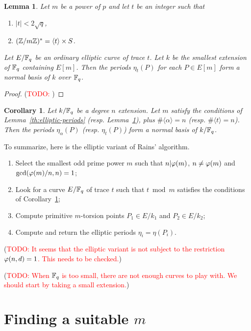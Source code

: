 \documentclass{article}
\newcommand{\todo}[1]{(\textcolor{red}{TODO: #1})}
\newtheorem{Lemma}{Lemma}
\newtheorem{Coro}{Corollary}
\begin{document}
\begin{Lemma}
  \label{th:elliptic-periods-p}
  Let $m$ be a power of $p$ and let $t$ be an integer such that
  \begin{enumerate}
  \item $|t|<2\sqrt{q}$,
  \item $(\mathbb{Z}/m\mathbb{Z})^\ast = \langle t\rangle \times S$.
  \end{enumerate}
  Let $E/\mathbb{F}_q$ be an ordinary elliptic curve of trace $t$. Let $k$ be
  the smallest extension of $\mathbb{F}_q$ containing $E[m]$. Then the periods
  $\eta_t(P)$ for each $P\in E[m]$ form a normal basis of $k$ over
  $\mathbb{F}_q$.
\end{Lemma}
\begin{proof}
  \todo{}
\end{proof}

\begin{Coro}
  \label{th:elliptic-rains}
  Let $k/\mathbb{F}_q$ be a degree $n$ extension. Let $m$ satisfy the
  conditions of Lemma~\ref{th:elliptic-periods}
  (resp. Lemma~\ref{th:elliptic-periods-p}), plus $\#\langle
  \alpha\rangle = n$ (resp. $\#\langle t\rangle=n$).  Then the periods
  $\eta_\alpha(P)$ (resp. $\eta_t(P)$) form a normal basis of
  $k/\mathbb{F}_q$.
\end{Coro}

To summarize, here is the elliptic variant of Rains' algorithm.

\begin{enumerate}
\item Select the smallest odd prime power $m$ such that $n|\varphi(m)$,
  $n\ne\varphi(m)$ and $\gcd(\varphi(m)/n,n)=1$;
\item Look for a curve $E/\mathbb{F}_q$ of trace $t$ such that $t\bmod m$
  satisfies the conditions of Corollary~\ref{th:elliptic-rains};
\item Compute primitive $m$-torsion points $P_1\in E/k_1$ and
  $P_2\in E/k_2$;
\item Compute and return the elliptic periods $\eta_i=\eta(P_i)$.
\end{enumerate}

\todo{It seems that the elliptic variant is not subject to the
  restriction $\varphi(n,d)=1$. This needs to be checked.}

\todo{When $\mathbb{F}_q$ is too small, there are not enough curves to play
  with. We should start by taking a small extension.}

\section{Finding a suitable $m$}
\end{document}
